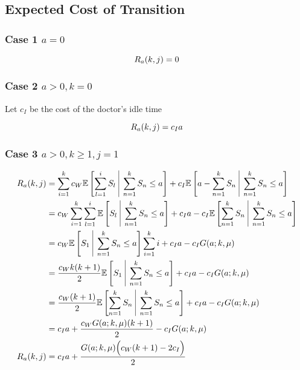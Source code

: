 \documentclass{article}
\begin{document}
\subsection{Expected Cost of Transition}

\subsubsection{Case 1 $a = 0$}

\begin{equation*}
	R_{a} (k, j) = 0 \\
\end{equation*}

\subsubsection{Case 2 $a > 0, k = 0$}

Let $c_{I}$ be the cost of the doctor's idle time

\begin{equation*}
	R_{a} (k, j) = c_{I} a \\
\end{equation*}

\subsubsection{Case 3 $a > 0, k \geq 1, j = 1$}

\begin{align*}
	R_{a} (k, j) & = \sum_{i = 1}^{k} c_{W} \mathbb{E} \left[ \sum_{l = 1}^{i} S_{l} \ \vline \ \sum_{n = 1}^{k} S_{n} \leq a \right] + c_{I} \mathbb{E} \left[ a - \sum_{n = 1}^{k} S_{n} \ \vline \ \sum_{n = 1}^{k} S_{n} \leq a \right] \\
	& = c_{W} \sum_{i = 1}^{k} \sum_{l = 1}^{i} \mathbb{E} \left[ S_{l} \ \vline \ \sum_{n = 1}^{k} S_{n} \leq a \right] + c_{I} a - c_{I} \mathbb{E} \left[ \sum_{n = 1}^{k} S_{n} \ \vline \ \sum_{n = 1}^{k} S_{n} \leq a \right] \\
	& = c_{W} \mathbb{E} \left[ S_{1} \ \vline \ \sum_{n = 1}^{k} S_{n} \leq a \right] \sum_{i = 1}^{k} i + c_{I} a - c_{I} G (a; k, \mu) \\
	& = \frac{c_{W} k (k + 1)}{2} \mathbb{E} \left[ S_{1} \ \vline \ \sum_{n = 1}^{k} S_{n} \leq a \right] + c_{I} a - c_{I} G (a; k, \mu) \\
	& = \frac{c_{W} (k + 1)}{2} \mathbb{E} \left[ \sum_{n = 1}^{k} S_{n} \ \vline \ \sum_{n = 1}^{k} S_{n} \leq a \right] + c_{I} a - c_{I} G (a; k, \mu) \\
	& = c_{I} a + \frac{c_{W} G (a; k, \mu) (k + 1)}{2} - c_{I} G (a; k, \mu) \\
	R_{a} (k, j) & = c_{I} a + \frac{G (a; k, \mu) \Big( c_{W} (k + 1) - 2 c_{I} \Big)}{2} \\
\end{align*}
\end{document}
